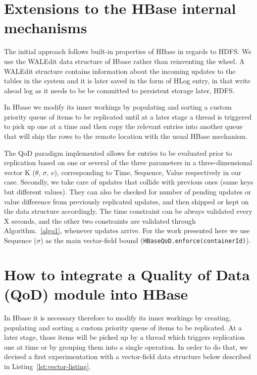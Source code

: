 \section{Extensions to the HBase internal mechanisms}\label{proposal}
The initial approach follows built-in properties of HBase in regards to HDFS. We use the WALEdit data structure of Hbase rather than reinventing the wheel. A WALEdit structure contains information about the incoming updates to the tables in the system and it is later saved in the form of HLog entry, in that write ahead log as it needs to be be committed to persistent storage later, HDFS.

In Hbase we modify its inner workings by populating and sorting a custom priority queue of items to be replicated until at a later stage a thread is triggered to pick up one at a time and then copy the relevant entries into another queue that will ship the rows to the remote location with the usual HBase mechanism.

The QoD paradigm implemented allows for entries to be evaluated prior to replication based on one or several of the three parameters in a three-dimensional vector K ($\theta$, $\sigma$, $\nu$), corresponding to Time, Sequence, Value respectively in our case. Secondly, we take care of updates that collide with previous ones (same keys but different values). They can also be checked for number of pending updates or value difference from previously replicated updates, and then shipped or kept on the data structure accordingly. The time constraint can be always validated every X seconds, and the other two constraints are validated through Algorithm.~\ref{algo1}, whenever updates arrive. For the work presented here we use Sequence ($\sigma$) as the main vector-field bound (\texttt{HBaseQoD.enforce(containerId)}).


\section{How to integrate a Quality of Data (QoD) module into HBase}\label{integration}

In Hbase it is necessary therefore to modify its inner workings by creating, populating and sorting a custom priority queue of items to be replicated. At a later stage, those items will be picked up by a thread which triggers replication one at time or by grouping them into a single operation. In order to do that, we devised a first experimentation with a vector-field data structure below described in Listing~\ref{lst:vector-listing}.

